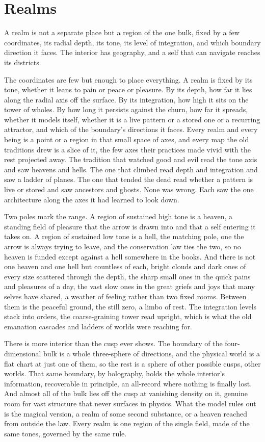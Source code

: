 \section{Realms}

A realm is not a separate place but a region of the one bulk, fixed by a few coordinates, its radial depth, its tone, its level of integration, and which boundary direction it faces. The interior has geography, and a self that can navigate reaches its districts.

The coordinates are few but enough to place everything. A realm is fixed by its tone, whether it leans to pain or peace or pleasure. By its depth, how far it lies along the radial axis off the surface. By its integration, how high it sits on the tower of wholes. By how long it persists against the churn, how far it spreads, whether it models itself, whether it is a live pattern or a stored one or a recurring attractor, and which of the boundary's directions it faces. Every realm and every being is a point or a region in that small space of axes, and every map the old traditions drew is a slice of it, the few axes their practices made vivid with the rest projected away. The tradition that watched good and evil read the tone axis and saw heavens and hells. The one that climbed read depth and integration and saw a ladder of planes. The one that tended the dead read whether a pattern is live or stored and saw ancestors and ghosts. None was wrong. Each saw the one architecture along the axes it had learned to look down.

Two poles mark the range. A region of sustained high tone is a heaven, a standing field of pleasure that the arrow is drawn into and that a self entering it takes on. A region of sustained low tone is a hell, the matching pole, one the arrow is always trying to leave, and the conservation law ties the two, so no heaven is funded except against a hell somewhere in the books. And there is not one heaven and one hell but countless of each, bright clouds and dark ones of every size scattered through the depth, the sharp small ones in the quick pains and pleasures of a day, the vast slow ones in the great griefs and joys that many selves have shared, a weather of feeling rather than two fixed rooms. Between them is the peaceful ground, the still zero, a limbo of rest. The integration levels stack into orders, the coarse-graining tower read upright, which is what the old emanation cascades and ladders of worlds were reaching for.

There is more interior than the cusp ever shows. The boundary of the four-dimensional bulk is a whole three-sphere of directions, and the physical world is a flat chart at just one of them, so the rest is a sphere of other possible cusps, other worlds. That same boundary, by holography, holds the whole interior's information, recoverable in principle, an all-record where nothing is finally lost. And almost all of the bulk lies off the cusp at vanishing density on it, genuine room for vast structure that never surfaces in physics. What the model rules out is the magical version, a realm of some second substance, or a heaven reached from outside the law. Every realm is one region of the single field, made of the same tones, governed by the same rule.
